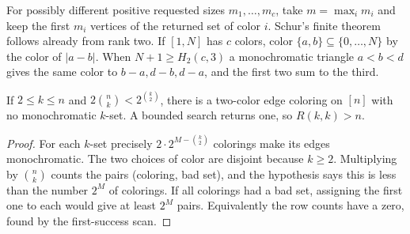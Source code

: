 For possibly different positive requested sizes $m_1,\ldots,m_c$, take $m=\max_i m_i$ and keep the first $m_i$ vertices of the returned set of color $i$. Schur's finite theorem follows already from rank two. If $[1,N]$ has $c$ colors, color $\{a,b\}\subseteq\{0,\ldots,N\}$ by the color of $|a-b|$. When $N+1\ge H_2(c,3)$ a monochromatic triangle $a<b<d$ gives the same color to $b-a,d-b,d-a$, and the first two sum to the third.

\begin{proposition}\label{result33}
If $2\le k\le n$ and $2\binom nk<2^{\binom k2}$, there is a two-color edge coloring on $[n]$ with no monochromatic $k$-set. A bounded search returns one, so $R(k,k)>n$.
\end{proposition}
\begin{proof}
For each $k$-set precisely $2\cdot 2^{M-\binom k2}$ colorings make its edges monochromatic. The two choices of color are disjoint because $k\ge2$. Multiplying by $\binom nk$ counts the pairs (coloring, bad set), and the hypothesis says this is less than the number $2^M$ of colorings. If all colorings had a bad set, assigning the first one to each would give at least $2^M$ pairs. Equivalently the row counts have a zero, found by the first-success scan.
\end{proof}

